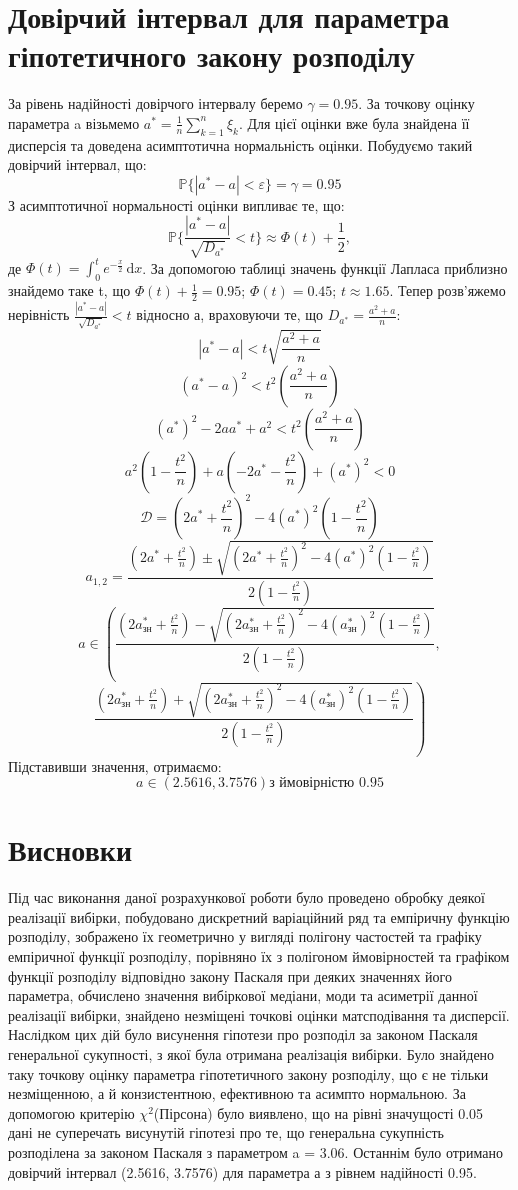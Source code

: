 \documentclass{article}
\begin{document}
\section{Довірчий інтервал для параметра гіпотетичного закону 
розподілу}
За рівень надійності довірчого інтервалу беремо $\gamma = 0.95$.
За точкову оцінку параметра a візьмемо $a^* = \frac{1}{n}
\sum_{k=1}^n \xi_k$. Для цієї оцінки вже була знайдена її дисперсія 
та доведена асимптотична нормальність оцінки. 
\newline
Побудуємо такий довірчий інтервал, що:
$$\mathbb{P} \{|a^* - a| < \varepsilon \} = \gamma = 0.95$$ 
З асимптотичної нормальності оцінки випливає те, що:
$$\mathbb{P}\{\frac{|a^* - a|}{\sqrt{D_{a^*}}} < t \} \approx 
\Phi(t) + \frac{1}{2},$$
де $\Phi(t) = \int_{0}^{t} e^{-\frac{x}{2}} \,\mathrm{d}x $.
За допомогою таблиці значень функції Лапласа приблизно 
знайдемо таке t, що $\Phi(t) + \frac{1}{2} = 0.95$; $\Phi(t) = 0.45$;
$t \approx 1.65$.
\newline
Тепер розв'яжемо нерівність $\frac{|a^* - a|}{\sqrt{D_{a^*}}} < t$ 
відносно а, враховуючи те, що $D_{a^*} = \frac{a^2 + a}{n}$:
$$|a^* - a| < t\sqrt{\frac{a^2 + a}{n}}$$
$$(a^* - a)^2 < t^2(\frac{a^2 + a}{n})$$
$$(a^*)^2 - 2aa^* + a^2 < t^2(\frac{a^2 + a}{n})$$
$$a^2(1 - \frac{t^2}{n}) + a(-2a^* - \frac{t^2}{n}) + (a^*)^2 < 0$$
$$\mathcal{D} = (2a^* + \frac{t^2}{n})^2 - 4(a^*)^2(1 - \frac{t^2}{n})$$
$$a_{1,2} = \frac{(2a^* + \frac{t^2}{n}) \pm 
\sqrt{(2a^* + \frac{t^2}{n})^2 - 4(a^*)^2(1 - \frac{t^2}{n})}}
{2(1 - \frac{t^2}{n})}$$
$$a \in \left(\frac{(2a^*_{\text{зн}} + \frac{t^2}{n}) - 
\sqrt{(2a^*_{\text{зн}} + \frac{t^2}{n})^2 - 4(a^*_{\text{зн}})^2(1 - \frac{t^2}{n})}}
{2(1 - \frac{t^2}{n})}, \right.$$
$$\left.\frac{(2a^*_{\text{зн}} + \frac{t^2}{n}) + 
\sqrt{(2a^*_{\text{зн}} + \frac{t^2}{n})^2 - 4(a^*_{\text{зн}})^2(1 - \frac{t^2}{n})}}
{2(1 - \frac{t^2}{n})}\right)$$
Підставивши значення, отримаємо:
$$a \in \left(2.5616, 3.7576\right) \text{з ймовірністю }0.95$$
\newpage
\section{Висновки}
Під час виконання даної розрахункової роботи було проведено обробку 
деякої реалізації вибірки, побудовано дискретний варіаційний ряд 
та емпіричну функцію розподілу, зображено їх геометрично у вигляді 
полігону частостей та графіку емпіричної функції розподілу, 
порівняно їх з полігоном ймовірностей та графіком функції розподілу 
відповідно закону Паскаля при деяких значеннях його параметра, 
обчислено значення вибіркової медіани, моди та асиметрії данної 
реалізації вибірки, знайдено незміщені точкові оцінки матсподівання 
та дисперсії. Наслідком цих дій було висунення гіпотези про розподіл 
за законом Паскаля генеральної сукупності, з якої була отримана 
реалізація вибірки. Було знайдено таку точкову оцінку параметра 
гіпотетичного закону розподілу, що є не тільки незміщенною, а й 
конзистентною, ефективною та асимпто нормальною. За допомогою критерію 
$\chi^2$(Пірсона) було виявлено, що на рівні значущості 0.05 дані не 
суперечать висунутій гіпотезі про те, що генеральна сукупність 
розподілена за законом Паскаля з параметром a = 3.06. Останнім було 
отримано довірчий інтервал (2.5616, 3.7576) для параметра а 
з рівнем надійності 0.95.
\end{document}
